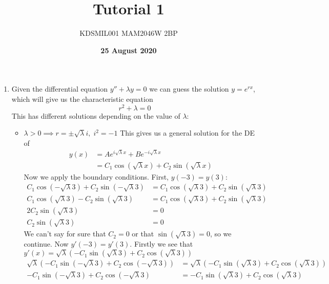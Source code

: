 \documentclass[12pt]{article}
\title{Tutorial 1}
\date{\textbf{25 August 2020}}
\author{KDSMIL001 \; MAM2046W 2BP}
\numberwithin{equation}{section}
\numberwithin{figure}{section}
\begin{document}
    \maketitle
    \begin{enumerate}
        \item Given the differential equation $y''+\lambda y=0$ we can guess the solution $y=e^{rx}$, 
        which will give us the characteristic equation
        \begin{equation*}
            r^2+\lambda=0
        \end{equation*}
        This has different solutions depending on the value of $\lambda$:
        \begin{itemize}
            \item $\lambda>0 \implies r=\pm \sqrt{\lambda}i,\; i^2=-1$\newline
            This gives us a general solution for the DE of
            \begin{align*}
                y(x)&=Ae^{i\sqrt\lambda x}+Be^{-i\sqrt\lambda x}\\
                &= C_1\cos(\sqrt\lambda x)+C_2\sin(\sqrt\lambda x)
            \end{align*}
            Now we apply the boundary conditions. First, $y(-3)=y(3)$:
            \begin{align*}
                C_1\cos(-\sqrt{\lambda} 3)+C_2\sin(-\sqrt{\lambda} 3)&=C_1\cos(\sqrt{\lambda} 3)+C_2\sin(\sqrt{\lambda} 3)\\
                C_1\cos(\sqrt{\lambda} 3)-C_2\sin(\sqrt{\lambda} 3)&=C_1\cos(\sqrt{\lambda} 3)+C_2\sin(\sqrt{\lambda} 3)\\
                2C_2\sin(\sqrt{\lambda} 3)&=0\\
                C_2\sin(\sqrt{\lambda} 3)&=0
            \end{align*}
            We can't say for sure that $C_2=0$ or that $\sin(\sqrt{\lambda}3)=0$, so we continue.\newline
            Now $y'(-3)=y'(3)$. Firstly we see that $y'(x)=\sqrt{\lambda}(-C_1\sin(\sqrt{\lambda} 3)+C_2\cos(\sqrt{\lambda} 3))$
            \begin{align*}
                \sqrt{\lambda}(-C_1\sin(-\sqrt{\lambda} 3)+C_2\cos(-\sqrt{\lambda} 3))&=\sqrt{\lambda}(-C_1\sin(\sqrt{\lambda} 3)+C_2\cos(\sqrt{\lambda} 3))\\
                -C_1\sin(-\sqrt{\lambda} 3)+C_2\cos(-\sqrt{\lambda} 3)&=-C_1\sin(\sqrt{\lambda} 3)+C_2\cos(\sqrt{\lambda} 3)\\

\end{align*}
\end{itemize}
\end{enumerate}
\end{document}
